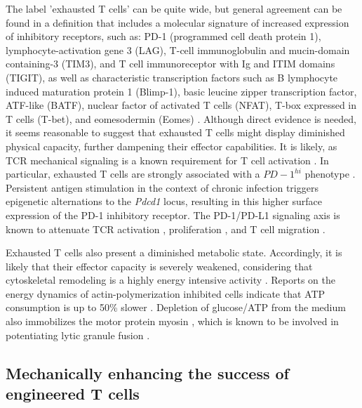 The label 'exhausted T cells' can be quite wide, but general agreement can be found in a definition that includes a molecular signature of increased expression of inhibitory receptors, such as: PD-1 (programmed cell death protein 1), lymphocyte-activation gene 3 (LAG), T-cell immunoglobulin and mucin-domain containing-3 (TIM3), and T cell immunoreceptor with Ig and ITIM domains (TIGIT), as well as characteristic transcription factors such as B lymphocyte induced maturation protein 1 (Blimp-1), basic leucine zipper transcription factor, ATF-like (BATF), nuclear factor of activated T cells (NFAT), T-box expressed in T cells (T-bet), and eomesodermin (Eomes) \cite{Wherry2011, Quigley2010, Keir2008, Doering2012, Wherry2007, Wang2012,  Lazarevic2013, Rangachari2012, Shin2009, Paley2012, Larsson2013}. Although direct evidence is needed, it seems reasonable to suggest that exhausted T cells might display diminished physical capacity, further dampening their effector capabilities. It is likely, as TCR mechanical signaling is a known requirement for T cell activation \cite{Hu2016}. In particular, exhausted T cells are strongly associated with a $PD-1^{hi}$ phenotype \cite{Keir2008}. Persistent antigen stimulation in the context of chronic infection triggers epigenetic alternations to the \textit{Pdcd1} locus, resulting in this higher surface expression of the PD-1 inhibitory receptor. The PD-1/PD-L1 signaling axis is known to attenuate TCR activation \cite{Mizuno2019}, proliferation \cite{Schietinger2014}, and T cell migration \cite{Zinselmeyer2013}. 

Exhausted T cells also present a diminished metabolic state. Accordingly, it is likely that their effector capacity is severely weakened, considering that cytoskeletal remodeling is a highly energy intensive activity \cite{Bernstein2002}. Reports on the energy dynamics of actin-polymerization inhibited cells indicate that ATP consumption is up to 50\% slower \cite{Bernstein2002, Ahmed2015}. Depletion of glucose/ATP from the medium also immobilizes the motor protein myosin \cite{Xu2014}, which is known to be involved in potentiating lytic granule fusion \cite{Basu2016}.

\subsection{Mechanically enhancing the success of engineered T cells}

